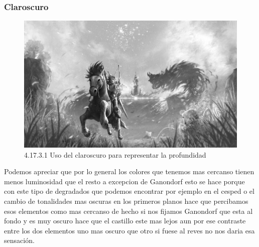 \documentclass[12pt]{article}
\begin{document}
      \subsubsection{Claroscuro}

        
        \begin{figure}[H]
          \centering
          \includegraphics[width=\textwidth]{images/Saúl/Sección 17/EA_img17_3Claroscuro_1Profundidad.png}
          \caption{\small 4.17.3.1 Uso del claroscuro para representar la profundidad}
        \end{figure}
        Podemos apreciar que por lo general los colores que tenemos mas cercanso tienen menos luminosidad que el resto a excepcion de Ganondorf esto se hace porque con este tipo de degradados que podemos encontrar por ejemplo en el cesped o el cambio de tonalidades mas oscuras en los primeros planos hace que percibamos esos elementos como mas cercanso de hecho si nos fijamos Ganondorf que esta al fondo y es muy oscuro hace que el castillo este mas lejos aun por ese contraste entre los dos elementos uno mas oscuro que otro si fuese al reves no nos daria esa sensación.
\end{document}
